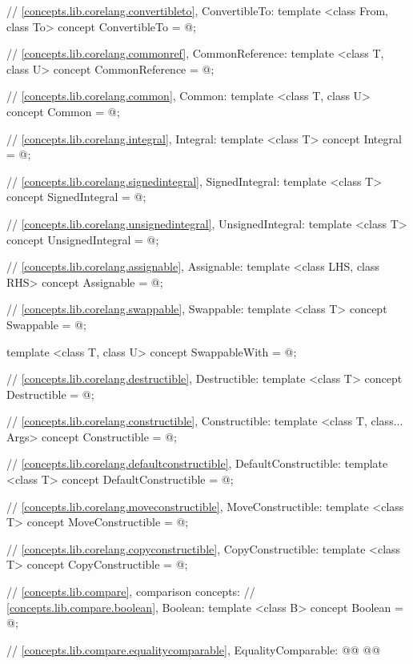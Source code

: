\begin{addedblock}
\begin{codeblock}
{  // \ref{concepts.lib.corelang.convertibleto}, ConvertibleTo:
  template <class From, class To>
  concept ConvertibleTo = @\seebelow@;

  // \ref{concepts.lib.corelang.commonref}, CommonReference:
  template <class T, class U>
  concept CommonReference = @\seebelow@;

  // \ref{concepts.lib.corelang.common}, Common:
  template <class T, class U>
  concept Common = @\seebelow@;

  // \ref{concepts.lib.corelang.integral}, Integral:
  template <class T>
  concept Integral = @\seebelow@;

  // \ref{concepts.lib.corelang.signedintegral}, SignedIntegral:
  template <class T>
  concept SignedIntegral = @\seebelow@;

  // \ref{concepts.lib.corelang.unsignedintegral}, UnsignedIntegral:
  template <class T>
  concept UnsignedIntegral = @\seebelow@;

  // \ref{concepts.lib.corelang.assignable}, Assignable:
  template <class LHS, class RHS>
  concept Assignable = @\seebelow@;

  // \ref{concepts.lib.corelang.swappable}, Swappable:
  template <class T>
  concept Swappable = @\seebelow@;

  template <class T, class U>
  concept SwappableWith = @\seebelow@;

  // \ref{concepts.lib.corelang.destructible}, Destructible:
  template <class T>
  concept Destructible = @\seebelow@;

  // \ref{concepts.lib.corelang.constructible}, Constructible:
  template <class T, class... Args>
  concept Constructible = @\seebelow@;

  // \ref{concepts.lib.corelang.defaultconstructible}, DefaultConstructible:
  template <class T>
  concept DefaultConstructible = @\seebelow@;

  // \ref{concepts.lib.corelang.moveconstructible}, MoveConstructible:
  template <class T>
  concept MoveConstructible = @\seebelow@;

  // \ref{concepts.lib.corelang.copyconstructible}, CopyConstructible:
  template <class T>
  concept CopyConstructible = @\seebelow@;

  // \ref{concepts.lib.compare}, comparison concepts:
  // \ref{concepts.lib.compare.boolean}, Boolean:
  template <class B>
  concept Boolean = @\seebelow@;

  // \ref{concepts.lib.compare.equalitycomparable}, EqualityComparable:
  @@
  @@

}
\end{codeblock}
\end{addedblock}
